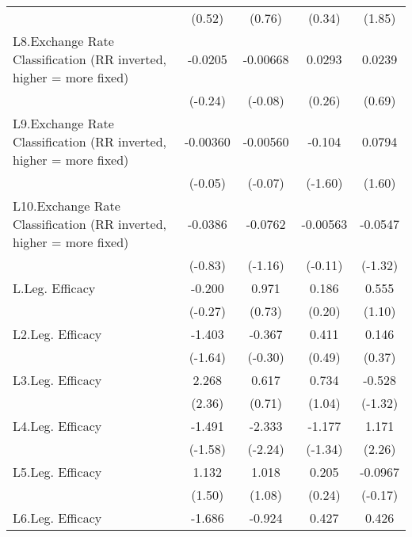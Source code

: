 {\begin{longtable}{l*{4}{c}}
                &   (0.52)         &   (0.76)         &   (0.34)         &   (1.85)         \\
[1em]
L8.Exchange Rate Classification (RR inverted, higher = more fixed)&  -0.0205         & -0.00668         &   0.0293         &   0.0239         \\
                &  (-0.24)         &  (-0.08)         &   (0.26)         &   (0.69)         \\
[1em]
L9.Exchange Rate Classification (RR inverted, higher = more fixed)& -0.00360         & -0.00560         &   -0.104         &   0.0794         \\
                &  (-0.05)         &  (-0.07)         &  (-1.60)         &   (1.60)         \\
[1em]
L10.Exchange Rate Classification (RR inverted, higher = more fixed)&  -0.0386         &  -0.0762         & -0.00563         &  -0.0547         \\
                &  (-0.83)         &  (-1.16)         &  (-0.11)         &  (-1.32)         \\
[1em]
L.Leg. Efficacy &   -0.200         &    0.971         &    0.186         &    0.555         \\
                &  (-0.27)         &   (0.73)         &   (0.20)         &   (1.10)         \\
[1em]
L2.Leg. Efficacy&   -1.403         &   -0.367         &    0.411         &    0.146         \\
                &  (-1.64)         &  (-0.30)         &   (0.49)         &   (0.37)         \\
[1em]
L3.Leg. Efficacy&    2.268\sym{*}  &    0.617         &    0.734         &   -0.528         \\
                &   (2.36)         &   (0.71)         &   (1.04)         &  (-1.32)         \\
[1em]
L4.Leg. Efficacy&   -1.491         &   -2.333\sym{*}  &   -1.177         &    1.171\sym{*}  \\
                &  (-1.58)         &  (-2.24)         &  (-1.34)         &   (2.26)         \\
[1em]
L5.Leg. Efficacy&    1.132         &    1.018         &    0.205         &  -0.0967         \\
                &   (1.50)         &   (1.08)         &   (0.24)         &  (-0.17)         \\
[1em]
L6.Leg. Efficacy&   -1.686         &   -0.924         &    0.427         &    0.426         \\

\end{longtable}}
